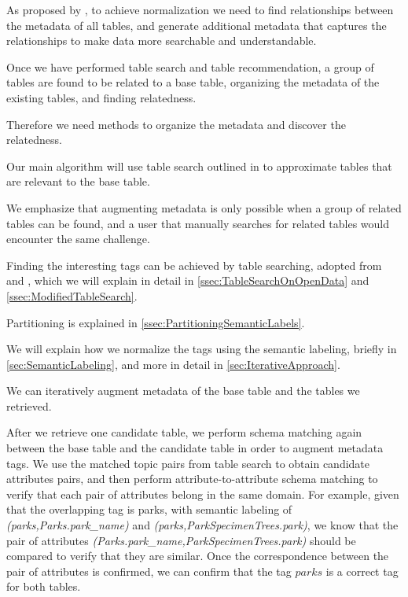 As proposed by \cite{Smith2011Unity}, to achieve normalization we need to find relationships between the metadata of all tables, and generate additional metadata that captures the relationships to make data more searchable and understandable.

Once we have performed table search and table recommendation, a group of tables are found to be related to a base table, organizing the metadata of the existing tables, and finding relatedness.

Therefore we need methods to organize the metadata and discover the relatedness.

Our main algorithm will use table search outlined in \cite{Mudgal2018Deep} to approximate tables that are relevant to the base table.

We emphasize that augmenting metadata is only possible when a group of related tables can be found, and a user that manually searches for related tables would encounter the same challenge.

Finding the interesting tags can be achieved by table searching, adopted from \cite{Nargesian2018Table} and \cite{conf/esws/EllefiBDT16}, which we will explain in detail in \autoref{ssec:TableSearchOnOpenData} and \autoref{ssec:ModifiedTableSearch}.

Partitioning is explained in \autoref{ssec:PartitioningSemanticLabels}.

We will explain how we normalize the tags using the semantic labeling, briefly in \autoref{sec:SemanticLabeling}, and more in detail in \autoref{sec:IterativeApproach}.

We can iteratively augment metadata of the base table and the tables we retrieved.

After we retrieve one candidate table, we perform schema matching again between the base table and the candidate table in order to augment metadata tags. We use the matched topic pairs from table search to obtain candidate attributes pairs, and then perform attribute-to-attribute schema matching to verify that each pair of attributes belong in the same domain. For example, given that the overlapping tag is parks, with semantic labeling of \textit{(parks,Parks.park\_name)} and \textit{(parks}\textit{,}\textit{Park\-Specimen\-Trees.park)}, we know that the pair of attributes \textit{(Parks.park\_name}\textit{,}\textit{Park\-Specimen\-Trees.park)} should be compared to verify that they are similar. Once the correspondence between the pair of attributes is confirmed, we can confirm that the tag $parks$ is a correct tag for both tables.

